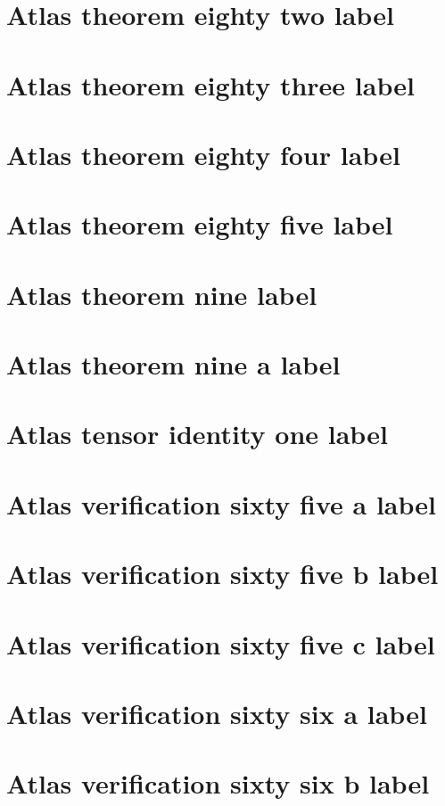 \documentclass[11pt]{article}
\theoremstyle{definition}
\begin{document}
\section{Atlas theorem eighty two label}
\label{ll:labels:atlas-t82}
\section{Atlas theorem eighty three label}
\label{ll:labels:atlas-t83}
\section{Atlas theorem eighty four label}
\label{ll:labels:atlas-t84}
\section{Atlas theorem eighty five label}
\label{ll:labels:atlas-t85}
\section{Atlas theorem nine label}
\label{ll:labels:atlas-t9}
\section{Atlas theorem nine a label}
\label{ll:labels:atlas-t9a}
\section{Atlas tensor identity one label}
\label{ll:labels:atlas-ti1}
\section{Atlas verification sixty five a label}
\label{ll:labels:atlas-v65a}
\section{Atlas verification sixty five b label}
\label{ll:labels:atlas-v65b}
\section{Atlas verification sixty five c label}
\label{ll:labels:atlas-v65c}
\section{Atlas verification sixty six a label}
\label{ll:labels:atlas-v66a}
\section{Atlas verification sixty six b label}
\label{ll:labels:atlas-v66b}
\end{document}
